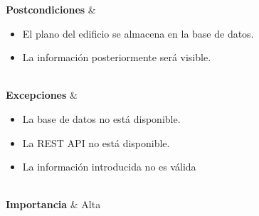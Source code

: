 {	\textbf{Postcondiciones} 		& 
	\begin{itemize}
		\item El plano del edificio se almacena en la base de datos.
		\item La información posteriormente será visible.
	\end{itemize}
	\\
	\textbf{Excepciones} 			& 
	\begin{itemize}
		\item La base de datos no está disponible.
		\item La REST API no está disponible.
		\item La información introducida no es válida
	\end{itemize}
	
	\\
	\textbf{Importancia} 			& Alta\\}


